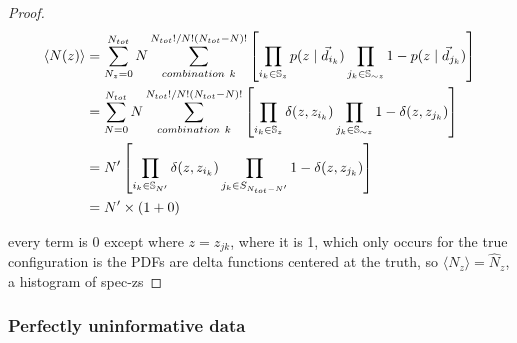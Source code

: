 \begin{proof}
\begin{align}
\label{eq:data}
\langle N(z) \rangle &= \sum_{N_{z} = 0}^{N_{tot}} N \sum_{combination\ k}^{N_{tot}! / N! (N_{tot} - N)!} \left[ \prod_{i_{k} \in \mathbb{S}_{z}} p(z \mid \vec{d}_{i_{k}}) \prod_{j_{k} \in \mathbb{S}_{\sim z}} 1 - p(z \mid \vec{d}_{j_{k}}) \right]\\
&= \sum_{N = 0}^{N_{tot}} N \sum_{combination\ k}^{N_{tot}! / N! (N_{tot} - N)!} \left[ \prod_{i_{k} \in \mathbb{S}_{z}} \delta(z, z_{i_{k}}) \prod_{j_{k} \in \mathbb{S}_{\sim z}} 1 - \delta(z, z_{j_{k}}) \right]\\
&= N' \left[ \prod_{i_{k} \in \mathbb{S}_{N'}} \delta(z, z_{i_{k}}) \prod_{j_{k} \in S_{N_{tot} -N'}} 1 - \delta(z, z_{j_{k}}) \right]\\
&= N' \times (1 + 0)\\
\end{align}

every term is 0 except where $z=z_{jk}$, where it is 1, which only occurs for the true configuration is the PDFs are delta functions centered at the truth, so $\langle N_{z}\rangle = \hat{N}_{z}$, a histogram of spec-zs
\end{proof}


\subsubsection{Perfectly uninformative data}
\label{sec:prior}


